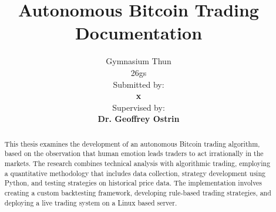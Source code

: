 \documentclass[12pt]{article}
\begin{document}


\title{\Huge Autonomous Bitcoin Trading\\\vspace{1cm}\Large Documentation}
\author{
    \Large Gymnasium Thun\\
     26gs\\
    \vspace{1cm}
    \Large Submitted by:\\
    \vspace{0.5cm}
    \textbf{x}\\
    \vspace{2cm}
    \Large Supervised by:\\
    \vspace{0.5cm}
    \textbf{Dr. Geoffrey Ostrin}
}

\maketitle
\clearpage

\begin{abstract}
    This thesis examines the development of an autonomous Bitcoin trading algorithm, based on the observation that human emotion leads traders to act irrationally in the markets.
    The research combines technical analysis with algorithmic trading, employing a quantitative methodology that includes data collection, strategy development using Python, and testing strategies on historical price data. The implementation involves creating a custom backtesting framework, developing rule-based trading strategies, and deploying a live trading system on a Linux based server.

\end{abstract}
\clearpage

\end{document}
